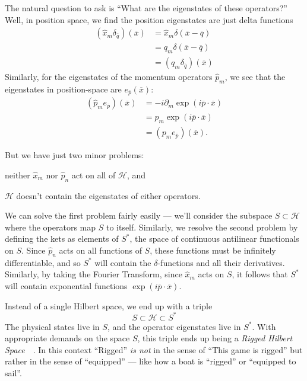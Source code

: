 The natural question to ask is ``What are the eigenstates of
these operators?'' Well, in position space, we find the position
eigenstates are just delta functions
\begin{subequations}
\begin{align}
(\widehat{x}_{m}\delta_{\overline{q}})(\overline{x}) &=
  \widehat{x}_{m}\delta(\overline{x}-\overline{q})\\
&= q_{m}\delta(\overline{x}-\overline{q})\\
&= (q_{m}\delta_{\overline{q}})(\overline{x})
\end{align}
\end{subequations}
Similarly, for the eigenstates of the momentum operators
$\widehat{p}_{m}$, we see that the eigenstates in position-space
are $e_{\overline{p}}(\overline{x})$:
\begin{subequations}
\begin{align}
(\widehat{p}_{m}e_{\overline{p}})(\overline{x}) &= -i\partial_{m}\exp(i\overline{p}\cdot\overline{x})\\
&= p_{m}\exp(i\overline{p}\cdot\overline{x})\\
&= (p_{m}e_{\overline{p}})(\overline{x}).
\end{align}
\end{subequations}

But we have just two minor problems: \begin{inparaenum}
\item neither $\widehat{x}_{m}$ nor $\widehat{p}_{n}$ act on all
  of $\mathcal{H}$, and
\item $\mathcal{H}$ doesn't contain the eigenstates of either
  operators.
\end{inparaenum}
We can solve the first problem fairly easily --- we'll consider
the subspace $S\subset{\mathcal{H}}$ where the operators map $S$
to itself. Similarly, we resolve the second problem by defining
the kets as elements of $S^{*}$, the space of continuous
antilinear functionals on $S$. Since $\widehat{p}_{n}$ acts on
all functions of $S$, these functions must be infinitely
differentiable, and so $S^{*}$ will contain the
$\delta$-functions and all their derivatives. Similarly, by
taking the Fourier Transform, since $\widehat{x}_{m}$ acts on
$S$, it follows that $S^{*}$ will contain exponential functions
$\exp(i\overline{p}\cdot\overline{x})$. 

Instead of a single Hilbert space, we end up with a triple
\begin{equation}%
S\subset{\mathcal{H}}\subset{S^{*}}
\end{equation}
The physical states live in $S$, and the operator eigenstates
live in $S^{*}$. With appropriate demands on the space $S$, 
this triple ends up being a \emph{Rigged Hilbert Space}~\cite{delamadrid}~\cite{Madrid:2004zy}. 
In this context ``Rigged'' \emph{is  not} in the sense of ``This
game is rigged'' but rather in the sense of ``equipped'' --- like
how a boat is ``rigged'' or ``equipped to sail''. 

